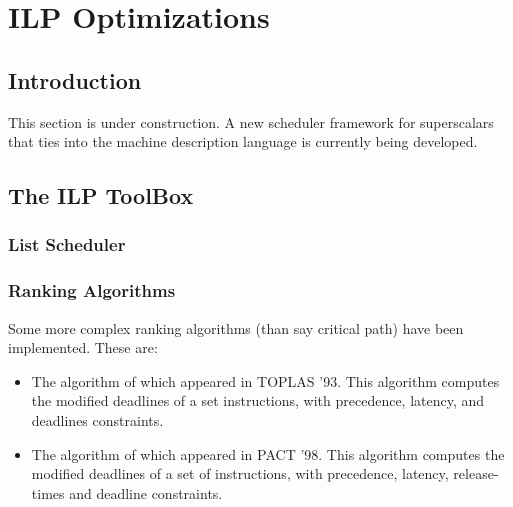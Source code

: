 \section{ILP Optimizations}
\subsection{Introduction}
    This section is under construction.  A new scheduler framework
for superscalars that ties into the machine description language
is currently being developed.
\subsection{The ILP ToolBox}
\subsubsection{List Scheduler}
\subsubsection{Ranking Algorithms}
   Some more complex ranking algorithms (than say critical path) have been
implemented.  These are:
\begin{itemize}
 \item The algorithm of
  which appeared in TOPLAS '93.  This algorithm
      computes the modified deadlines of a set instructions, with
      precedence, latency, and deadlines constraints.
      
 \item The algorithm of 
       which appeared in PACT '98.
      This algorithm computes the modified deadlines of a set of instructions,
      with precedence, latency, release-times and deadline constraints.
\end{itemize}
